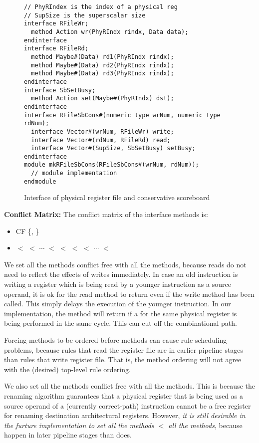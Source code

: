 \begin{figure}
\begin{lstlisting}[caption={}]
// PhyRIndex is the index of a physical reg
// SupSize is the superscalar size
interface RFileWr;
  method Action wr(PhyRIndx rindx, Data data);
endinterface
interface RFileRd;
  method Maybe#(Data) rd1(PhyRIndx rindx);
  method Maybe#(Data) rd2(PhyRIndx rindx);
  method Maybe#(Data) rd3(PhyRIndx rindx);
endinterface
interface SbSetBusy;
  method Action set(Maybe#(PhyRIndx) dst);
endinterface
interface RFileSbCons#(numeric type wrNum, numeric type rdNum);
  interface Vector#(wrNum, RFileWr) write;
  interface Vector#(rdNum, RFileRd) read;
  interface Vector#(SupSize, SbSetBusy) setBusy;
endinterface
module mkRFileSbCons(RFileSbCons#(wrNum, rdNum));
  // module implementation
endmodule
\end{lstlisting}
\caption{Interface of physical register file and conservative scoreboard}\label{fig:prf-sb-ifc}
\end{figure}

\noindent\textbf{Conflict Matrix:}
The conflict matrix of the interface methods is:
\begin{itemize}
    \item {} CF \{, \}
    \item {} $<$  $<$ $\cdots$ $<$  $<$  $<$  $<$ $\cdots$ $<$ 
\end{itemize}
We set all the  methods conflict free with all the  methods, because reads do not need to reflect the effects of writes immediately.
In case an old instruction is writing a register which is being read by a younger instruction as a source operand, it is ok for the read method to return  even if the write method has been called.
This simply delays the execution of the younger instruction.
In our implementation, the  method will return  if a  for the same physical register is being performed in the same cycle.
This can cut off the combinational path.

Forcing  methods to be ordered before  methods can cause rule-scheduling problems, because rules that read the register file are in earlier pipeline stages than rules that write register file.
That is, the method ordering will not agree with the (desired) top-level rule ordering.

We also set all the  methods conflict free with all the  methods.
This is because the renaming algorithm guarantees that a physical register that is being used as a source operand of a (currently correct-path) instruction cannot be a free register for renaming destination architectural registers.
However, \emph{it is still desirable in the furture implementation to set all the  methods $<$ all the  methods}, because  happen in later pipeline stages than  does.

